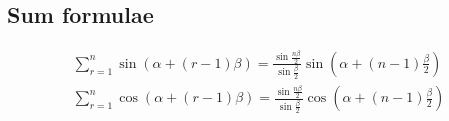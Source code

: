 \documentclass[12pt]{article}
\begin{document}
	\subsection{Sum formulae}
	\begin{align}
		\sum_{r=1}^{n} \sin(\alpha + (r-1)\beta) = \frac{\sin\frac{n\beta}{2}}{\sin\frac{\beta}{2}} \sin\left( \alpha + (n-1)\frac\beta 2\right) \\
		\sum_{r=1}^{n} \cos(\alpha + (r-1)\beta) = \frac{\sin\frac{n\beta}{2}}{\sin\frac{\beta}{2}} \cos\left( \alpha + (n-1)\frac\beta 2\right)		
	\end{align}
\end{document}
